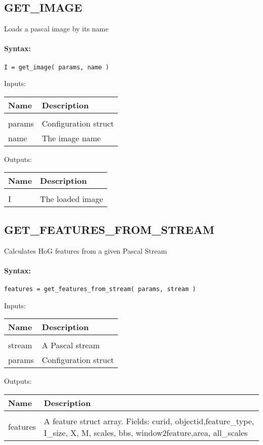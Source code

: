 \subsection{GET\_IMAGE}

Loads a pascal image by its name

\paragraph{Syntax:} \verb|I = get_image( params, name )|

Inputs:

\begin{tabular}{|l|p{5cm}|}
\hline
\textbf{Name} & \textbf{Description} \\
\hline \hline \\
params & Configuration struct  \\ \hline
name & The image name  \\ \hline
\end{tabular}
Outputs:

\begin{tabular}{|l|p{5cm}|}
\hline
\textbf{Name} & \textbf{Description} \\
\hline \hline \\
I & The loaded image  \\ \hline
\end{tabular}

\subsection{GET\_FEATURES\_FROM\_STREAM}

Calculates HoG features from a given Pascal Stream

\paragraph{Syntax:} \verb|features = get_features_from_stream( params, stream )|

Inputs:

\begin{tabular}{|l|p{5cm}|}
\hline
\textbf{Name} & \textbf{Description} \\
\hline \hline \\
stream & A Pascal stream  \\ \hline
params & Configuration struct  \\ \hline
\end{tabular}
Outputs:

\begin{tabular}{|l|p{5cm}|}
\hline
\textbf{Name} & \textbf{Description} \\
\hline \hline \\
features & A feature struct array. Fields: curid, objectid,feature\_type, I\_size, X, M, scales, bbs, window2feature,area, all\_scales  \\ \hline
\end{tabular}

